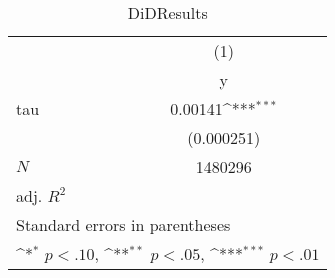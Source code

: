 \begin{table}[htbp]\centering
\def\sym#1{\ifmmode^{#1}\else\(^{#1}\)\fi}
\caption{DiDResults}
\begin{tabular}{l*{1}{c}}
\hline\hline
            &\multicolumn{1}{c}{(1)}\\
            &\multicolumn{1}{c}{y}\\
\hline
tau         &     0.00141\sym{***}\\
            &  (0.000251)         \\
\hline
\(N\)       &     1480296         \\
adj. \(R^{2}\)&                     \\
\hline\hline
\multicolumn{2}{l}{\footnotesize Standard errors in parentheses}\\
\multicolumn{2}{l}{\footnotesize \sym{*} \(p<.10\), \sym{**} \(p<.05\), \sym{***} \(p<.01\)}\\
\end{tabular}
\end{table}

